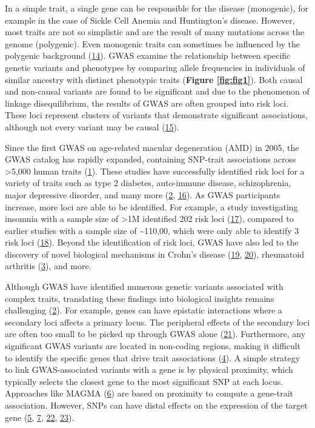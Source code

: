 In a simple trait, a single gene can be responsible for the disease (monogenic), for example in the case of Sickle Cell Anemia and Huntington's disease.
However, most traits are not so simplistic and are the result of many mutations across the genome (polygenic).
Even monogenic traits can sometimes be influenced by the polygenic background (\protect\hyperlink{ref-VqGYQMXO}{14}).
GWAS examine the relationship between specific genetic variants and phenotypes by comparing allele frequencies in individuals of similar ancestry with distinct phenotypic traits (\textbf{Figure \ref{fig:fig1}}).
Both causal and non-causal variants are found to be significant and due to the phenomenon of linkage disequilibrium, the results of GWAS are often grouped into risk loci.
These loci represent clusters of variants that demonstrate significant associations, although not every variant may be causal (\protect\hyperlink{ref-1873zCaaX}{15}).

Since the first GWAS on age-related macular degeneration (AMD) in 2005, the GWAS catalog has rapidly expanded, containing SNP-trait associations across \textgreater5,000 human traits (\protect\hyperlink{ref-VRCjjZ9L}{1}).
These studies have successfully identified risk loci for a variety of traits such as type 2 diabetes, auto-immune disease, schizophrenia, major depressive disorder, and many more (\protect\hyperlink{ref-17B4AigZT}{2}, \protect\hyperlink{ref-yqBcaXHD}{16}).
As GWAS participants increase, more loci are able to be identified.
For example, a study investigating insomnia with a sample size of \textgreater1M identified 202 risk loci (\protect\hyperlink{ref-sBTrhvlJ}{17}), compared to earlier studies with a sample size of \textasciitilde110,00, which were only able to identify 3 risk loci (\protect\hyperlink{ref-crCAymA1}{18}).
Beyond the identification of risk loci, GWAS have also led to the discovery of novel biological mechanisms in Crohn's disease (\protect\hyperlink{ref-s6z5ZuY3}{19}, \protect\hyperlink{ref-gxwza7fO}{20}), rheumatoid arthritis (\protect\hyperlink{ref-HicyXvA4}{3}), and more.

Although GWAS have identified numerous genetic variants associated with complex traits, translating these findings into biological insights remains challenging (\protect\hyperlink{ref-17B4AigZT}{2}).
For example, genes can have epistatic interactions where a secondary loci affects a primary locus.
The peripheral effects of the secondary loci are often too small to be picked up through GWAS alone (\protect\hyperlink{ref-IrGVpNji}{21}).
Furthermore, any significant GWAS variants are located in non-coding regions, making it difficult to identify the specific genes that drive trait associations (\protect\hyperlink{ref-BqjxxhyF}{4}).
A simple strategy to link GWAS-associated variants with a gene is by physical proximity, which typically selects the closest gene to the most significant SNP at each locus.
Approaches like MAGMA (\protect\hyperlink{ref-19XiXgYmd}{6}) are based on proximity to compute a gene-trait association.
However, SNPs can have distal effects on the expression of the target gene (\protect\hyperlink{ref-9Pr9idng}{5}, \protect\hyperlink{ref-167QL5tMV}{7}, \protect\hyperlink{ref-OBxYzUMh}{22}, \protect\hyperlink{ref-WfdUHVDA}{23}).

